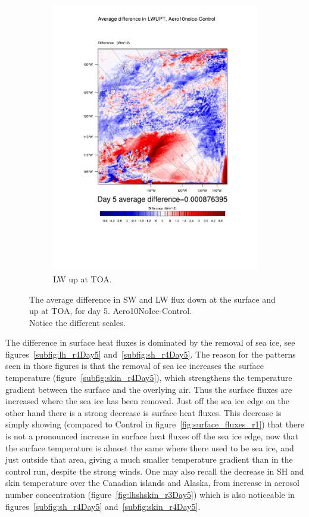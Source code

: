 \begin{figure}
\begin{subfigure}{0.48\textwidth}
		\includegraphics[width=\textwidth]{results/aero10ni/diff_Aero10NoIce_LWUPT_Day5.pdf}
		\caption{LW up at TOA.}
		\label{subfig:lwup_r4Day5}
	\end{subfigure}
	\caption{The average difference in SW and LW flux down at the surface and up at TOA, for day 5. Aero10NoIce-Control.\\Notice the different scales.}
	\label{fig:radiation_r4Day5}
\end{figure}

The difference in surface heat fluxes is dominated by the removal of sea ice, see figures~\ref{subfig:lh_r4Day5} and~\ref{subfig:sh_r4Day5}. The reason for the patterns seen in those figures is that the removal of sea ice increases the surface temperature (figure~\ref{subfig:skin_r4Day5}), which strengthens the temperature gradient between the surface and the overlying air. Thus the surface fluxes are increased where the sea ice has been removed. Just off the sea ice edge on the other hand there is a strong decrease is surface heat fluxes. This decrease is simply showing (compared to Control in figure~\ref{fig:surface_fluxes_r1}) that there is not a pronounced increase in surface heat fluxes off the sea ice edge, now that the surface temperature is almost the same where there used to be sea ice, and just outside that area, giving a much smaller temperature gradient than in the control run, despite the strong winds. One may also recall the decrease in SH and skin temperature over the Canadian islands and Alaska, from increase in aerosol number concentration (figure~\ref{fig:lhshskin_r3Day5}) which is also noticeable in figures~\ref{subfig:sh_r4Day5} and~\ref{subfig:skin_r4Day5}.

